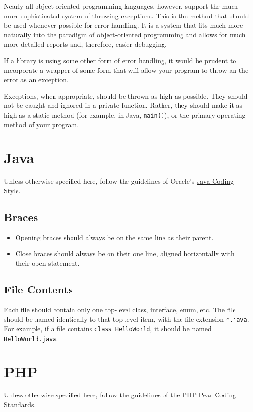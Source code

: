 \documentclass[12pt,letter]{memoir} %
\begin{document}
			Nearly all object-oriented programming languages, however, support
			the much more sophisticated system of throwing exceptions. This is
			the method that should be used whenever possible for error handling.
			It is a system that fits much more naturally into the paradigm of
			object-oriented programming and allows for much more detailed
			reports and, therefore, easier debugging.
			
			If a library is using some other form of error handling, it would be
			prudent to incorporate a wrapper of some form that will allow your
			program to throw an the error as an exception.
			
			Exceptions, when appropriate, should be thrown as high as possible.
			They should not be caught and ignored in a private function. Rather,
			they should make it as high as a static method (for example, in
			Java, \texttt{main()}), or the primary operating method of your
			program.
	\section{Java}
		Unless otherwise specified here, follow the guidelines of Oracle's
		\href{http://www.oracle.com/technetwork/java/codeconvtoc-136057.html}{Java Coding Style}.
		\subsection{Braces}
			\begin{itemize}
				\item Opening braces should always be on the same line as their
					parent.
				\item Close braces should always be on their one line, aligned
					horizontally with their open statement.
			\end{itemize}
		\subsection{File Contents}
			Each file should contain only one top-level class, interface, enum,
			etc. The file should be named identically to that top-level item,
			with the file extension \texttt{*.java}. For example, if a file
			contains \texttt{class HelloWorld}, it should be named
			\texttt{HelloWorld.java}.
	\section{PHP}
		Unless otherwise specified here, follow the guidelines of the PHP Pear
		\href{http://pear.php.net/manual/en/standards.php}{Coding Standards}.
\end{document}
